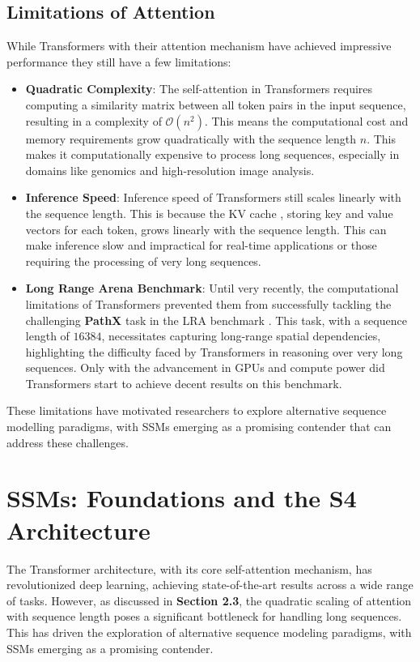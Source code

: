 \documentclass[12pt,a4paper]{report}
\begin{document}
\section{Limitations of Attention}
While Transformers with their attention mechanism have achieved impressive performance they still have a few limitations:
\begin{itemize}
    \item \textbf{Quadratic Complexity}: The self-attention in Transformers requires computing a similarity matrix between all token pairs in the input sequence, resulting in a complexity of $\mathcal{O}(n^2)$. This means the computational cost and memory requirements grow quadratically with the sequence length $n$. This makes it computationally expensive to process long sequences, especially in domains like genomics and high-resolution image analysis.
    \item \textbf{Inference Speed}: Inference speed of Transformers still scales linearly with the sequence length. This is because the KV cache \cite{mqa}, storing key and value vectors for each token, grows linearly with the sequence length. This can make inference slow and impractical for real-time applications or those requiring the processing of very long sequences.
    \item \textbf{Long Range Arena Benchmark}: Until very recently, the computational limitations of Transformers prevented them from successfully tackling the challenging \textbf{PathX} task in the LRA benchmark \cite{lra}. This task, with a sequence length of $16384$, necessitates capturing long-range spatial dependencies, highlighting the difficulty faced by Transformers in reasoning over very long sequences. Only with the advancement in GPUs and compute power did Transformers start to achieve decent results on this benchmark.
\end{itemize}

These limitations have motivated researchers to explore alternative sequence modelling paradigms, with SSMs emerging as a promising contender that can address these challenges.

\chapter{SSMs: Foundations and the S4 Architecture}

The Transformer architecture, with its core self-attention mechanism, has revolutionized deep learning, achieving state-of-the-art results across a wide range of tasks. However, as discussed in \textbf{Section 2.3}, the quadratic scaling of attention with sequence length poses a significant bottleneck for handling long sequences. This has driven the exploration of alternative sequence modeling paradigms, with SSMs emerging as a promising contender.
\end{document}
